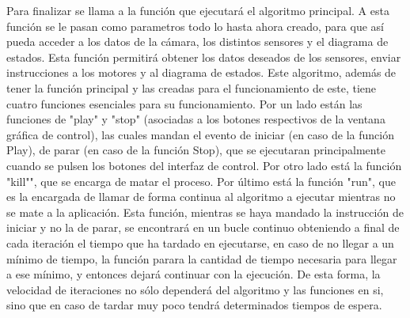\hspace{1 cm} Para finalizar se llama a la funci\'on que ejecutar\'a el algoritmo principal. A esta funci\'on se le pasan como parametros todo lo hasta ahora creado, para que as\'i pueda acceder a los datos de la c\'amara, los distintos sensores y el diagrama de estados. Esta funci\'on permitir\'a obtener los datos deseados de los sensores, enviar instrucciones a los motores y al diagrama de estados. Este algoritmo, adem\'as de tener la funci\'on principal y las creadas para el funcionamiento de este, tiene cuatro funciones esenciales para su funcionamiento. Por un lado est\'an las funciones de "play" y "stop" (asociadas a los botones respectivos de la ventana gr\'afica de control), las cuales mandan el evento de iniciar (en caso de la funci\'on Play), de parar (en caso de la funci\'on Stop), que se ejecutaran principalmente cuando se pulsen los botones del interfaz de control. Por otro lado est\'a la funci\'on "kill"", que se encarga de matar el proceso. Por \'ultimo est\'a la funci\'on "run", que es la encargada de llamar de forma continua al algoritmo a ejecutar mientras no se mate a la aplicaci\'on. Esta funci\'on, mientras se haya mandado la instrucci\'on de iniciar y no la de parar, se encontrar\'a en un bucle continuo obteniendo a final de cada iteraci\'on el tiempo que ha tardado en ejecutarse, en caso de no llegar a un m\'inimo de tiempo, la funci\'on parara la cantidad de tiempo necesaria para llegar a ese m\'inimo, y entonces dejar\'a continuar con la ejecuci\'on. De esta forma, la velocidad de iteraciones no s\'olo depender\'a del algoritmo y las funciones en si, sino que en caso de tardar muy poco tendr\'a determinados tiempos de espera.

















